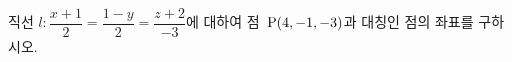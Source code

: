 직선 $l\colon \dfrac{x+1}{2}=\dfrac{1-y}{2}=\dfrac{z+2}{-3}$에 대하여 점~$\mathrm{P}(4{,}\mkern3mu\mathopen{}-1{,}\mkern3mu\mathopen{}-3)$과 대칭인 점의 좌표를 구하시오.
